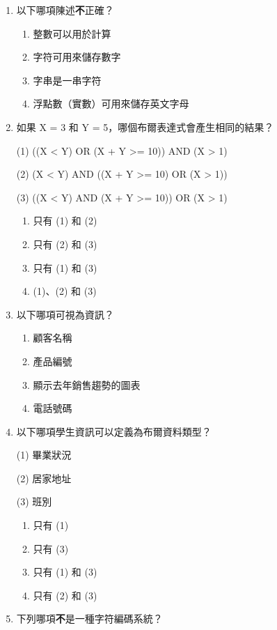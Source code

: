 \documentclass[12pt,a4paper]{article}
\begin{document}
\begin{enumerate}
\item 以下哪項陳述\textbf{不}正確？

\begin{enumerate}[label=\Alph*.]
\item 整數可以用於計算
\item 字符可用來儲存數字
\item 字串是一串字符
\item 浮點數（實數）可用來儲存英文字母
\end{enumerate}

\item 如果 X = 3 和 Y = 5，哪個布爾表達式會產生相同的結果？

(1) ((X < Y) OR (X + Y >= 10)) AND (X > 1)

(2) (X < Y) AND ((X + Y >= 10) OR (X > 1))

(3) ((X < Y) AND (X + Y >= 10)) OR (X > 1)

\begin{enumerate}[label=\Alph*.]
\item 只有 (1) 和 (2)
\item 只有 (2) 和 (3)
\item 只有 (1) 和 (3)
\item (1)、(2) 和 (3)
\end{enumerate}

\item 以下哪項可視為資訊？

\begin{enumerate}[label=\Alph*.]
\item 顧客名稱
\item 產品編號
\item 顯示去年銷售趨勢的圖表
\item 電話號碼
\end{enumerate}

\item 以下哪項學生資訊可以定義為布爾資料類型？

(1) 畢業狀況

(2) 居家地址

(3) 班別

\begin{enumerate}[label=\Alph*.]
\item 只有 (1)
\item 只有 (3)
\item 只有 (1) 和 (3)
\item 只有 (2) 和 (3)
\end{enumerate}

\item 下列哪項\textbf{不}是一種字符編碼系統？


\end{enumerate}
\end{document}
